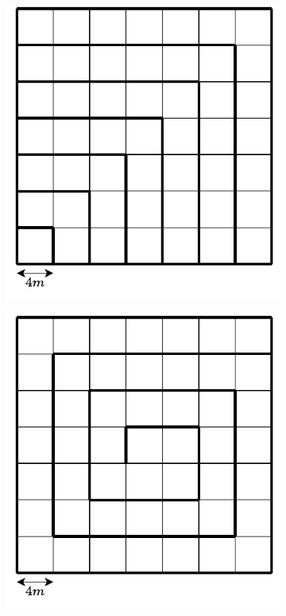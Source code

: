 \begin{figure}[!h]
    \centering
    \begin{subfigure}{0.40\textwidth}
        \centering
        \includegraphics[width=1\textwidth]{figures/squares.pdf}
        \caption{  }
        \label{fig:squares}
    \end{subfigure}
    \begin{subfigure}{0.40\textwidth}
        \centering
        \includegraphics[width=1\textwidth]{figures/spiral.pdf}
        \caption{  }
        \label{fig:spiral}
    \end{subfigure}
\end{figure}

